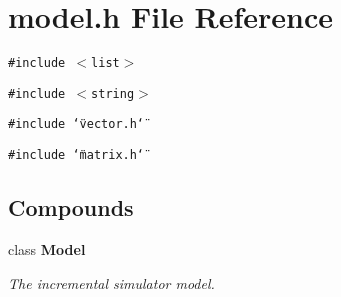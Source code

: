 \section{model.h File Reference}
\label{model_8h}
{\tt \#include $<$list$>$}\par
{\tt \#include $<$string$>$}\par
{\tt \#include \char`\"{}vector.h\char`\"{}}\par
{\tt \#include \char`\"{}matrix.h\char`\"{}}\par
\subsection*{Compounds}
\begin{CompactItemize}
\item 
class {\bf Model}
\begin{CompactList}\small\item\em The incremental simulator model.\item\end{CompactList}\end{CompactItemize}
